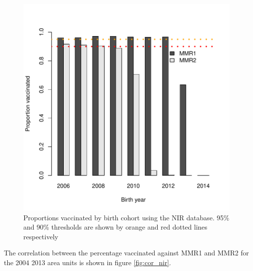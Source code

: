\documentclass{article}
\begin{document}
\begin{figure}
\begin{center}
\includegraphics{draftfinalreport_v3-024}
\end{center}
\caption{Proportions vaccinated by birth cohort using the NIR database. 95\% and 90\% thresholds are shown by orange and red dotted lines respectively}
\label{fig:mmr_nir}
\end{figure}

The correlation between the percentage vaccinated against MMR1 and MMR2 for the 2004 2013 area units is shown in figure \autoref{fig:cor_nir}.
\end{document}
